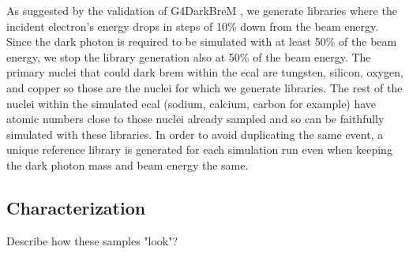As suggested by the validation of G4DarkBreM \cite{g4darkbrem}, we generate libraries where the
incident electron's energy drops in steps of 10\% down from the beam energy. Since the dark photon
is required to be simulated with at least 50\% of the beam energy, we stop the library generation
also at 50\% of the beam energy. The primary nuclei that could dark brem within the \ac{ecal} are
tungsten, silicon, oxygen, and copper so those are the nuclei for which we generate libraries. The
rest of the nuclei within the simulated \ac{ecal} (sodium, calcium, carbon for example) have atomic
numbers close to those nuclei already sampled and so can be faithfully simulated with these
libraries. In order to avoid duplicating the same event, a unique reference library is generated
for each simulation run even when keeping the dark photon mass and beam energy the same.

\subsection{Characterization}
Describe how these samples "look"?

